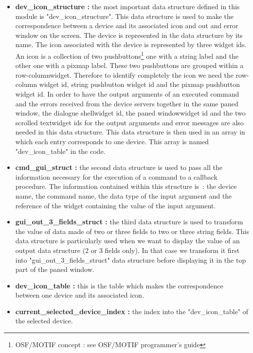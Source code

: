 \begin{itemize}
\item
{\bf dev\_icon\_structure : } the most important data structure defined in this
module is "dev\_icon\_structure". This data structure is used to make the
correspondence between a device and its associated icon and out and error  
 window on the screen. The
device is represented in the data structure by its name. The icon associated
with the device is represented by three widget ids. An icon is a collection
of two pushbuttons\footnote[1]{OSF/MOTIF concept : see OSF/MOTIF programmer's
guide} one with a string label and the other one with a pixmap
label. These two pushbuttons are grouped within a row-column\footnotemark[1]
widget. Therefore to identify completely the icon we need the row-column widget
id, string pushbutton widget id and the pixmap pushbutton widget id. 
In order to have the output arguments of an executed command and the errors
received from the device servers together in the same paned window\footnotemark[1], the dialogue shell\footnotemark[1] widget id, the paned window\footnotemark[1] widget id and the two scrolled text\footnotemark[1] widget ids for the
output arguments and error messages are also needed in this data structure.
This data
structure is then used in an array in which each entry corresponds to one
device. This array is named "dev\_icon\_table" in the code.
\item
{\bf cmd\_gui\_struct : } the second data structure is used to pass all the
information necessary for the execution of a command to a callback procedure.
The information contained within this structure is~: the device name, the
command name, the data type of the input argument and the reference of the
widget containing the value of the input argument.
\item
{\bf gui\_out\_3\_fields\_struct : } the third data structure is used to
transform the value of data made of two or three fields to two or three string
fields. This data structure is particularly used when we want to display the
value of an output data structure (2 or 3 fields only). In that case we
transform it first into "gui\_out\_3\_fields\_struct" data structure before
displaying it in the top part of the paned window.
\item
{\bf dev\_icon\_table : } this is the table which makes the correspondence
between one device and its associated icon.
\item
{\bf current\_selected\_device\_index : } the index into the "dev\_icon\_table" 
of the selected device. 
\end{itemize}

